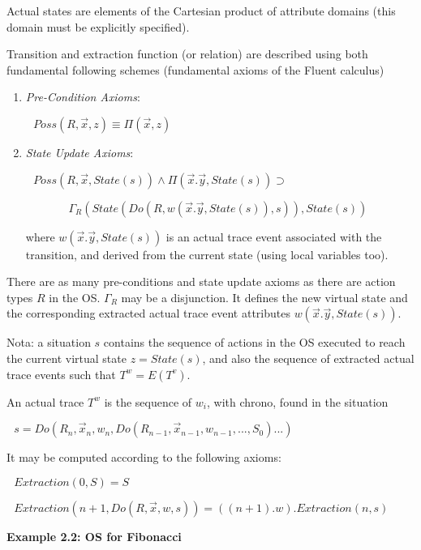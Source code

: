 Actual states are elements of the Cartesian product of attribute domains (this domain must be explicitly specified).

Transition and extraction function (or relation) are described using both fundamental following schemes (fundamental axioms of the Fluent calculus)

\begin{enumerate}
\item \textit{Pre-Condition Axioms}:
 
$\ \ \ Poss(R, \vec{x}, z)  \equiv \Pi(\vec{x}, z)$




\item \textit{State Update Axioms}: 

$\ \ \ Poss(R, \vec{x}, State(s)) \land \Pi(\vec{x}.\vec{y}, State(s)) \supset $

$\ \ \ \ \ \ \ \ \ \ \ \ \ \ \ \ \ \Gamma_R(State(Do(R, w(\vec{x}.\vec{y}, State(s)),s)), State(s))$


where $w(\vec{x}.\vec{y},State(s))$ is an actual trace event associated with the transition, and derived from the current state (using local variables too).
\end{enumerate}

There are as many pre-conditions and state update axioms as there are action types $R$ in the OS. $\Gamma_R$ may be a disjunction. It defines the new virtual state and the corresponding extracted actual trace event attributes $w(\vec{x}.\vec{y},State(s))$.

\vspace{1mm}
Nota: a situation $s$ contains the sequence of actions in the OS executed to reach the current virtual state $z=State(s)$, and also the sequence of extracted actual trace events such that $T^w = E(T^v)$.

\vspace{1mm}
An actual trace $T^w$ is the sequence of $w_i$, with chrono, found in the situation 

$\ \ \ s = Do(R_n, \vec{x}_n, w_n, Do(R_{n-1}, \vec{x}_{n-1}, w_{n-1}, ..., S_0)...)$


It may be computed according to the following axioms:

$\ \ \ Extraction(0,S) = S$

$\ \ \ Extraction(n+1, Do(R,\vec{x}, w, s)) = ((n+1).w).Extraction(n, s)$


\vspace{4mm}
{\bf Example 2.2: OS for Fibonacci}
\label{ssec:fibSFC}

